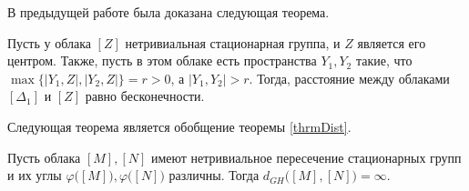 В предыдущей работе была доказана следующая теорема.
\begin{theorem}
  Пусть у облака $[Z]$ нетривиальная стационарная группа, и $Z$
  является его центром. Также, пусть в этом облаке есть пространства $Y_{1},
  Y_{2}$ такие, что $\max\big\{ |Y_{1},Z|, |Y_{2}, Z| \big\} = r>0$, а
  $|Y_{1}, Y_{2}|>r$. Тогда, расстояние между облаками $[\Delta_1]$ и $[Z]$
  равно бесконечности. \label{thrmDist}
\end{theorem}
Следующая теорема является обобщение теоремы \ref{thrmDist}.
\begin{theorem}
  Пусть облака \( [M], [N] \) имеют нетривиальное пересечение
  стационарных групп и их углы \( \varphi \big([M]\big), \varphi
  \big([N]\big) \) различны. Тогда \( d_{GH} \big([M], [N]\big) = \infty \).
\end{theorem}
